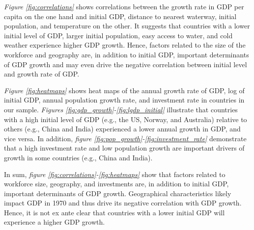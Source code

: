\documentclass[11pt]{article}
\begin{document}


\textit{Figure \ref{fig:correlations}} shows correlations between the growth rate in GDP per capita on the one hand and initial GDP, distance to nearest waterway, initial population, and temperature on the other. 
It suggests that countries with a lower initial level of GDP, larger initial population, easy access to water, and cold weather experience higher GDP growth. Hence, factors related to the size of the workforce and geography are, in addition to initial GDP, important determinants of GDP growth and may even drive the negative correlation between initial level and growth rate of GDP. 



\textit{Figure \ref{fig:heatmaps}} shows heat maps of the annual growth rate of GDP, log of initial GDP, annual population growth rate, and investment rate in countries in our sample. 
\textit{Figures \ref{fig:gdp_growth}-\ref{fig:lgdp_initial}} illustrate that countries with a high initial level of GDP (e.g., the US, Norway, and Australia) relative to others (e.g., China and India) experienced a lower annual growth in GDP, and vice versa. 
In addition, \textit{figure \ref{fig:pop_growth}-\ref{fig:investment_rate}} demonstrate that a high investment rate and low population growth are important drivers of growth in some countries (e.g., China and India). 

In sum, \textit{figure \ref{fig:correlations}-\ref{fig:heatmaps}} show that factors related to workforce size, geography, and investments are, in addition to initial GDP, important determinants of GDP growth. Geographical characteristics likely impact GDP in 1970 and thus drive its negative correlation with GDP growth. Hence, it is not ex ante clear that countries with a lower initial GDP will experience a higher GDP growth. 

\end{document}
